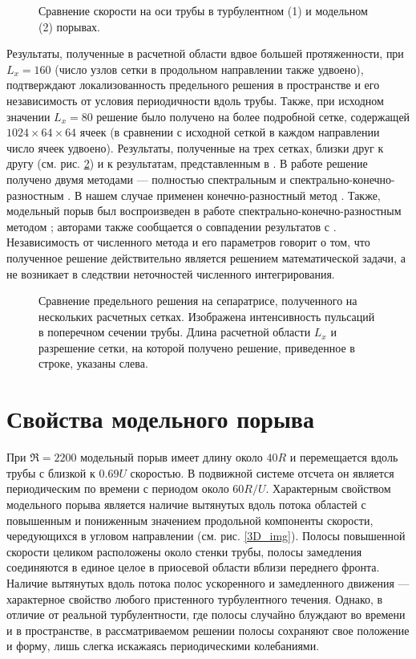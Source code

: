 \begin{figure}[h]
\caption{Сравнение скорости на оси трубы в турбулентном (1) и модельном (2) порывах.}
\label{ucl_cmp_img}
\end{figure}

Результаты, полученные в расчетной области вдвое большей протяженности, при $L_x = 160$ (число узлов сетки в продольном направлении также удвоено), подтверждают локализованность предельного решения в пространстве и его независимость от условия периодичности вдоль трубы. Также, при исходном значении $L_x = 80$ решение было получено на более подробной сетке, содержащей $1024 \times 64 \times 64$ ячеек (в сравнении с исходной сеткой в каждом направлении число ячеек удвоено).  Результаты, полученные на трех сетках, близки друг к другу (см. рис. \ref{mesh_conv_pic}) и к результатам, представленным в \cite{Avila2013}. В работе \cite{Avila2013} решение получено двумя методами --- полностью спектральным \cite{Meseguer2007} и спектрально-конечно-разностным \cite{Willis2009}. В нашем случае применен конечно-разностный метод \cite{Nikitin2006}. Также, модельный порыв был воспроизведен в работе \cite{Chantry2014} спектрально-конечно-разностным методом \cite{Willis2009}; авторами также сообщается о совпадении результатов с \cite{Avila2013}. Независимость от численного метода и его параметров говорит о том, что полученное решение действительно является решением математической задачи, а не возникает в следствии неточностей численного интегрирования. 

\begin{figure}[h]
\caption{Сравнение предельного решения на сепаратрисе, полученного на нескольких расчетных сетках. Изображена интенсивность пульсаций в поперечном сечении трубы. Длина расчетной области $L_x$ и разрешение сетки, на которой получено решение, приведенное в строке, указаны слева. }
\label{mesh_conv_pic}
\end{figure}


\section{Свойства модельного порыва}

При $\Re=2200$ модельный порыв имеет длину около $40R$ и перемещается вдоль трубы с близкой к $0.69U$ скоростью. В подвижной системе отсчета он является периодическим по времени с периодом около $60 R/U$. Характерным свойством модельного порыва является наличие вытянутых вдоль потока областей с повышенным и пониженным значением продольной компоненты скорости, чередующихся в угловом направлении (см. рис. \ref{3D_img}). Полосы повышенной скорости целиком расположены около стенки трубы, полосы замедления соединяются в единое целое в приосевой области вблизи переднего фронта. Наличие вытянутых вдоль потока полос ускоренного и замедленного движения --- характерное свойство любого пристенного турбулентного течения. Однако, в отличие от реальной турбулентности, где полосы случайно блуждают во времени и в пространстве, в рассматриваемом решении полосы сохраняют свое положение и форму, лишь слегка искажаясь периодическими колебаниями. 

